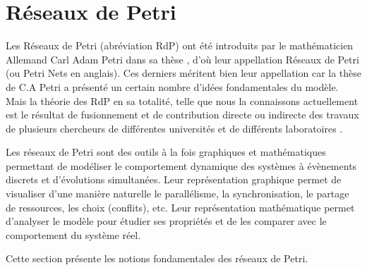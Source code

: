 \section{Réseaux de Petri}
Les Réseaux de Petri (abréviation  RdP) ont été introduits par le mathématicien Allemand Carl Adam Petri dans sa thèse \citep{Carl1962}, d'où leur appellation Réseaux de Petri (ou Petri Nets en anglais). Ces derniers méritent bien leur  appellation  car  la  thèse de C.A Petri a présenté un certain nombre d'idées fondamentales du modèle. Mais la théorie des RdP en sa totalité, telle que nous la connaissons actuellement est le résultat de fusionnement et de contribution directe ou indirecte des travaux de plusieurs  chercheurs de différentes universités et de différents laboratoires \citep{Robert2007}.

Les réseaux de Petri sont des outils à la fois graphiques et mathématiques permettant de modéliser le comportement dynamique des systèmes à  évènements discrets et d'évolutions simultanées. Leur représentation graphique permet de visualiser d'une manière naturelle le parallélisme, la synchronisation, le partage de ressources, les choix (conflits), etc. Leur représentation mathématique permet d'analyser le modèle pour étudier ses propriétés et de les comparer avec le comportement du système réel.

Cette section présente les notions fondamentales des réseaux de Petri.

